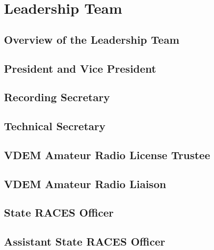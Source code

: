 \documentclass[pdflatex,letterpaper,twoside,12pt]{book}
\begin{document}
\section{Leadership Team}

\subsection{Overview of the Leadership Team}

\subsection{President and Vice President}

\subsection{Recording Secretary}

\subsection{Technical Secretary}

\subsection{VDEM Amateur Radio License Trustee}

\subsection{VDEM Amateur Radio Liaison}

\subsection{State RACES Officer}

\subsection{Assistant State RACES Officer}

\end{document}
